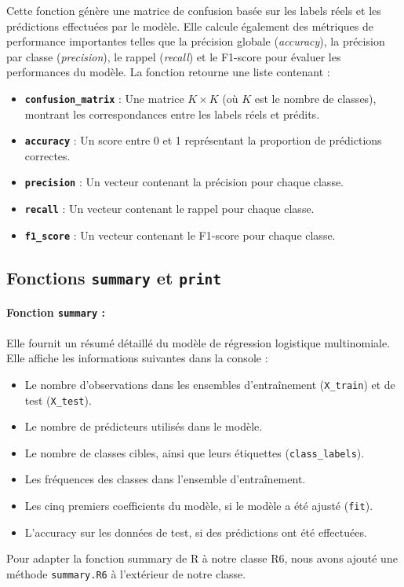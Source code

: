 \documentclass{rapport}
\begin{document}
Cette fonction génère une matrice de confusion basée sur les labels réels et les prédictions effectuées par le modèle. Elle calcule également des métriques de performance importantes telles que la précision globale (\textit{accuracy}), la précision par classe (\textit{precision}), le rappel (\textit{recall}) et le F1-score pour évaluer les performances du modèle.
La fonction retourne une liste contenant :
\begin{itemize}
    \item \textbf{\texttt{confusion\_matrix}} : Une matrice $K \times K$ (où $K$ est le nombre de classes), montrant les correspondances entre les labels réels et prédits.
    \item \textbf{\texttt{accuracy}} : Un score entre 0 et 1 représentant la proportion de prédictions correctes.
    \item \textbf{\texttt{precision}} : Un vecteur contenant la précision pour chaque classe.
    \item \textbf{\texttt{recall}} : Un vecteur contenant le rappel pour chaque classe.
    \item \textbf{\texttt{f1\_score}} : Un vecteur contenant le F1-score pour chaque classe.
\end{itemize}


\subsection{Fonctions \texttt{summary} et \texttt{print}}

\paragraph{Fonction \texttt{summary} :}
Elle fournit un résumé détaillé du modèle de régression logistique multinomiale. Elle affiche les informations suivantes dans la console :
\begin{itemize}
    \item Le nombre d'observations dans les ensembles d'entraînement (\texttt{X\_train}) et de test (\texttt{X\_test}).
    \item Le nombre de prédicteurs utilisés dans le modèle.
    \item Le nombre de classes cibles, ainsi que leurs étiquettes (\texttt{class\_labels}).
    \item Les fréquences des classes dans l'ensemble d'entraînement.
    \item Les cinq premiers coefficients du modèle, si le modèle a été ajusté (\texttt{fit}).
    \item L'accuracy sur les données de test, si des prédictions ont été effectuées.
\end{itemize}
Pour adapter la fonction summary de R à notre classe R6, nous avons ajouté une méthode \texttt{summary.R6} à l'extérieur de notre classe.
\end{document}
